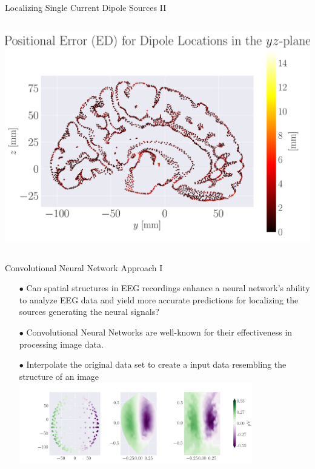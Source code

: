 \documentclass[aspectratio=169, 9pt]{beamer}
\begin{document}
\begin{frame}{Localizing Single Current Dipole Sources II}
\begin{columns}
    \begin{column}{0.3\textwidth}
      \begin{itemize}
        \includegraphics[width=1.0\textwidth]{figures/MED_simple_dipole_error_Euclidean Distance_2.pdf}
      \end{itemize}
    \end{column}
  \end{columns}
\end{frame}


\begin{frame}{Convolutional Neural Network Approach I}
    \begin{itemize}
      \item[$\bullet$] Can spatial structures in EEG recordings enhance a neural network’s ability to analyze EEG data and yield more accurate predictions for localizing the sources generating the neural signals?
      \item[$\bullet$] Convolutional Neural Networks are well-known for their effectiveness in processing image data.
      \item[$\bullet$] Interpolate the original data set to create a input data resembling the structure of an image
      \includegraphics[width=0.8\textwidth]{figures/one_dipole_eeg_dipole_pos_0.png}
    \end{itemize}
\end{frame}
\end{document}

